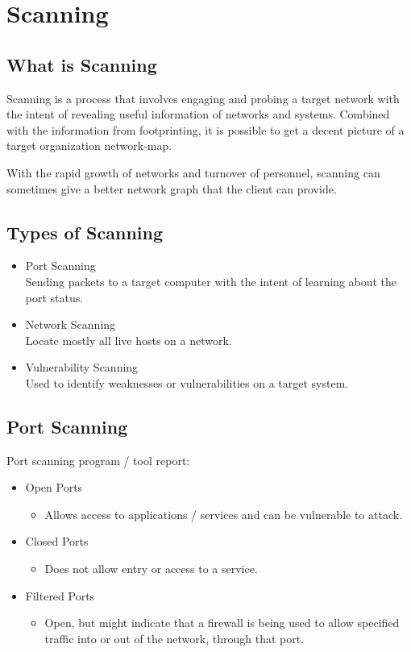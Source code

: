 \section{Scanning}
\subsection{What is Scanning}

Scanning is a process that involves engaging and probing a target network with the intent of revealing useful information of networks and systems.
Combined with the information from footprinting, it is possible to get a decent picture of a target organization network-map.

With the rapid growth of networks and turnover of personnel, scanning can sometimes give a better network graph that the client can provide.


\subsection{Types of Scanning}
\begin{itemize}
    \item Port Scanning\\
        Sending packets to a target computer with the intent of learning about the port status.
    \item Network Scanning\\
        Locate mostly all live hosts on a network.
    \item Vulnerability Scanning\\
        Used to identify weaknesses or vulnerabilities on a target system.
\end{itemize}
\subsection{Port Scanning}

Port scanning program / tool report:
\begin{itemize}
    \item Open Ports
    \begin{itemize}
        \item Allows access to applications / services and can be vulnerable to attack.
    \end{itemize}
    \item Closed Ports
    \begin{itemize}
        \item Does not allow entry or access to a service.
    \end{itemize}
    \item Filtered Ports
    \begin{itemize}
        \item Open, but might indicate that a firewall is being used to allow specified traffic into or out of the network, through that port.
    \end{itemize}
\end{itemize}

